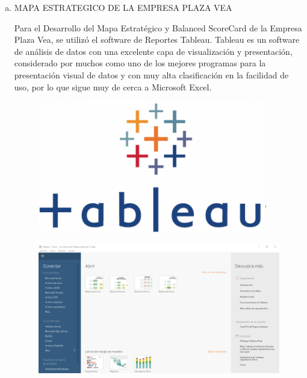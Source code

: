 \begin{enumerate}[a)]
\begin{itemize}
			\end{itemize}

	\item MAPA ESTRATEGICO DE LA EMPRESA PLAZA VEA


	Para el Desarrollo del Mapa Estratégico y Balanced ScoreCard de la Empresa Plaza Vea, se utilizó el software de Reportes Tableau.
Tableau es un software de análisis de datos con una excelente capa de visualización y presentación, considerado por muchos como uno de los mejores programas para la presentación visual de datos y con muy alta clasificación en la facilidad de uso, por lo que sigue muy de cerca a Microsoft Excel.

			\begin{figure}[htb]
				\begin{center}
					\includegraphics[width=10cm]{./Imagenes/8}
				\end{center}
			\end{figure}


			\begin{figure}[htb]
				\begin{center}
					\includegraphics[width=17cm]{./Imagenes/9}
				\end{center}
			\end{figure}



\end{enumerate}
